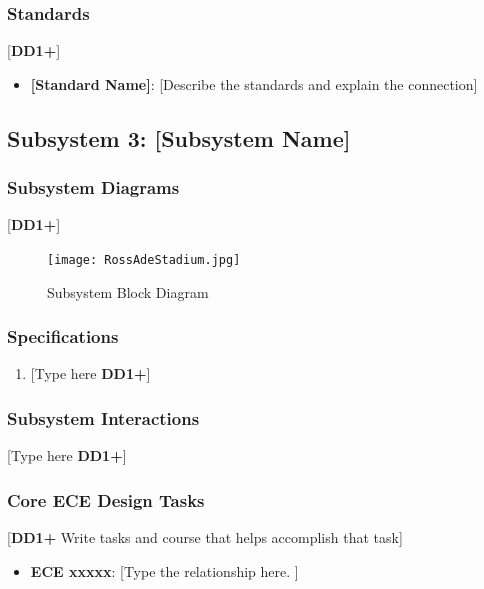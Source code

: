 \documentclass[letterpaper, 11pt]{article}
\begin{document}
\subsubsection{Standards}
[\textbf{DD1+}]
\begin{itemize}
    \item \textbf{[Standard Name]}: [Describe the standards and explain the connection]
\end{itemize}

\clearpage
\subsection{Subsystem 3: [Subsystem Name]}

\subsubsection{Subsystem Diagrams}
[\textbf{DD1+}]
\begin{figure}[h]
    \centering
    \texttt{[image: RossAdeStadium.jpg]} %
    \caption{Subsystem Block Diagram}
\end{figure} %

\subsubsection{Specifications}
\begin{enumerate}
    \item {[Type here \textbf{DD1+}]}
\end{enumerate}

\subsubsection{Subsystem Interactions}
[Type here \textbf{DD1+}]

\subsubsection{Core ECE Design Tasks}
[\textbf{DD1+} Write tasks and course that helps accomplish that task]
\begin{itemize}
    \item \textbf{ECE xxxxx}: [Type the relationship here. ]
\end{itemize}
\end{document}
